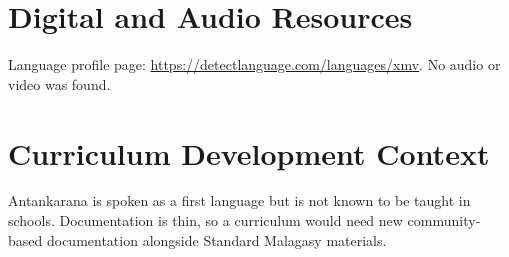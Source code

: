 \documentclass[12pt]{article}
\begin{document}
\section{Digital and Audio Resources}
Language profile page: \url{https://detectlanguage.com/languages/xmv}. No audio or video was found.

\section{Curriculum Development Context}
Antankarana is spoken as a first language but is not known to be taught in schools. Documentation is thin, so a curriculum would need new community-based documentation alongside Standard Malagasy materials.
\end{document}
